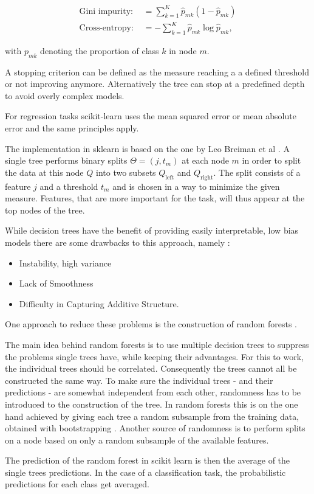 \begin{align}
	\text{Gini impurity: } &= \sum_{k=1}^K \hat{p}_{mk}(1-\hat{p}_{mk}) \\
	\text{Cross-entropy: } &= -\sum_{k=1}^K \hat{p}_{mk}\log{\hat{p}_{mk}},
  \label{eq:gini_ce}
\end{align}

with $p_{mk}$ denoting the proportion of class $k$ in node $m$.

A stopping criterion can be defined as the measure reaching a
a defined threshold or not improving anymore.
Alternatively the tree can stop at a predefined depth to
avoid overly complex models.

For regression tasks scikit-learn uses the mean squared error
or mean absolute error and the same principles apply.

The implementation in sklearn is based on the one by
Leo Breiman et al \cite{breimanclassification}.
A single tree performs binary splits $\Theta = (j, t_m)$
at each node $m$ in order to split
the data at this node $Q$ into two subsets
$Q_\text{left}$
and
$Q_\text{right}$.
The split consists of a feature $j$ and a threshold $t_m$ and is
chosen in a way to minimize the given measure.
Features, that are more important for the task, will
thus appear at the top nodes of the tree.


While decision trees have the benefit of providing
easily interpretable, low bias models there are some drawbacks to this
approach, namely \cite{hastie2017springer}:
\begin{itemize}
  \item{Instability, high variance}
  \item{Lack of Smoothness}
  \item{Difficulty in Capturing Additive Structure}.
\end{itemize}

One approach to reduce these problems is the construction of
random forests \cite{Breiman2001}.

The main idea behind random forests is to use multiple
decision trees to suppress the problems single trees have, while
keeping their advantages.
For this to work, the individual trees should  be correlated.
Consequently the trees cannot all be constructed the same way.
To make sure the individual trees
- and their predictions -
are somewhat independent from each other,
randomness has to be introduced to the construction of the tree.
In random forests this is on the one hand achieved by giving each tree a
random subsample from the training data, obtained with bootstrapping \cite{efron1992bootstrap}.
Another source of randomness is to perform splits on a node
based on only a random subsample of the available features.

The prediction of the random forest in scikit learn is then the average of
the single trees predictions.
In the case of a classification task, the probabilistic predictions for each class
get averaged.
